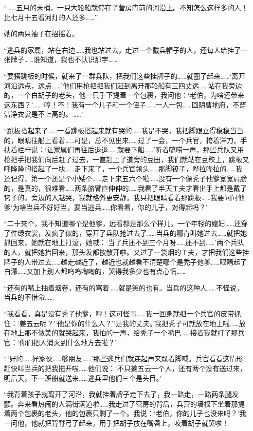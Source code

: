 \par “……五月的末梢，一只大轮船就停在了营房门前的河沿上。不知怎么这样多的人！比七月十五看河灯的人还多……”
\par 她的两只袖子在招摇着。
\par “逃兵的家属，站在右边……我也站过去，走过一个戴兵帽子的人，还每人给挂了一张牌子……谁知道，我也不认识那字……
\par “要搭跳板的时候，就来了一群兵队，把我们这些挂牌子的……就圈了起来……‘离开河沿远点，远点……’他们用枪把把我们赶到离开那轮船有三四丈远……站在我旁边的，一个白胡子的老头，他一只手下提着一个包裹，我问他：‘老伯，为啥还带来这东西？'……‘哼！不！我有一个儿子和一个侄子……一人一包……回阴曹地府，不穿洁净衣裳是不上高的。……’
\par “跳板搭起来了……一看跳板搭起来就有哭的……我是不哭，我把脚跟立得稳稳当当的，眼睛往船上看着……可是，总不见出来……过了一会，一个兵官，挎着洋刀，手扶着栏杆说：‘让家属们再往后退退……就要下船……’听着嗃唠一声，那些兵队又用枪把手把我们向后赶了过去，一直赶上了道旁的豆田，我们就站在豆秧上，跳板又呼隆隆的搭起了一块……走下来了，一个兵官领头……那脚镣子，哗拉哗拉的……我还记得，第一个还是个小矮个……走下来五六个啦……没有一个像秃子他爹宽宽肩膀的，是真的，很难看……两条胳臂直伸伸的……我看了半天工夫才看出手上都是戴了铐子的。旁边的人越哭，我就格外更安静。我只把眼睛看着那跳板……我要问问他爹‘为啥当兵不好好当，要当逃兵……你看看，你的儿子，对得起吗？’
\par “二十来个，我不知道哪个是他爹，远看都是那么个样儿。一个年轻的媳妇……还穿了件绿衣裳，发疯了似的，穿开了兵队抢过去了……当兵的哪肯叫她过去……就把她抓回来，她就在地上打滚，她喊：‘当了兵还不到三个月呀……还不到……’两个兵队的人，就把她抬回来，那头发都披散开啦。又过了一袋烟的工夫，才把我们这些挂牌子的人带过去……越走越近了，越近也就越看不清楚哪个是秃子他爹……眼睛起了白濛……又加上别人都呜呜啕啕的，哭得我多少也有点心慌……
\par “还有的嘴上抽着烟卷，还有的骂着……就是笑的也有。当兵的这种人……不怪说，当兵的不惜命……
\par “我看看，真是没有秃子他爹，哼！这可怪事……我一回身就把一个兵官的皮带抓住：‘姜五云呢？'‘他是你的什么人？'‘是我的丈夫。’我把秃子可就放在地上啦……放在地上那不做美的就哭起来，我拍的一声，给秃子一个嘴巴……接着我就打了那兵官：‘你们把人消灭到什么地方去啦？’
\par “‘好的……好家伙……够朋友……’那些逃兵们就连起声来跺着脚喊。兵官看看这情形赶快叫当兵的把我拖开啦……他们说：‘不只姜五云一个人，还有两个没有送过来，明后天，下一班船就送来……逃兵里他们三个是头目。’
\par “我背着孩子就离开了河沿，我就挂着牌子走下去了，我一路走，一路两条腿发颤。奔来看热闹的人满街满道啦……我走过了营房的背后，兵营的墙根下坐着那提着两个包裹的老头，他的包裹只剩了一个。我说：‘老伯，你的儿子也没来吗？’我一问他，他就把背脊弓了起来，用手把胡子放在嘴唇上，咬着胡子就哭啦！
